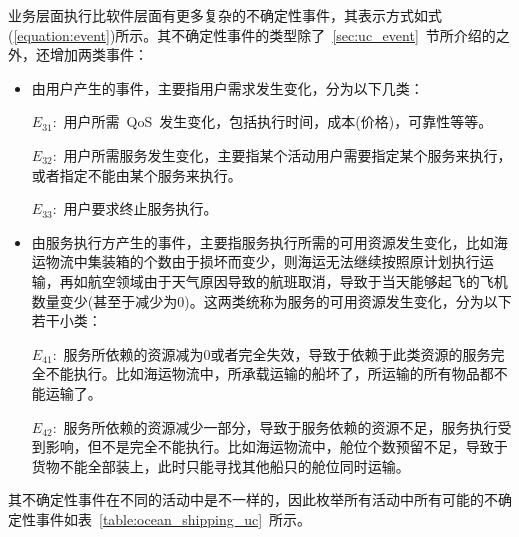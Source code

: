 业务层面执行比软件层面有更多复杂的不确定性事件，其表示方式如式(\ref{equation:event})所示。其不确定性事件的类型除了~\ref{sec:uc_event}~节所介绍的之外，还增加两类事件：

\begin{itemize}
    
    \item 由用户产生的事件，主要指用户需求发生变化，分为以下几类：
    
    $E_{31}$:~用户所需~QoS~发生变化，包括执行时间，成本(价格)，可靠性等等。
    
    $E_{32}$:~用户所需服务发生变化，主要指某个活动用户需要指定某个服务来执行，或者指定不能由某个服务来执行。

    $E_{33}$:~用户要求终止服务执行。

    \item 由服务执行方产生的事件，主要指服务执行所需的可用资源发生变化，比如海运物流中集装箱的个数由于损坏而变少，则海运无法继续按照原计划执行运输，再如航空领域由于天气原因导致的航班取消，导致于当天能够起飞的飞机数量变少(甚至于减少为0)。这两类统称为服务的可用资源发生变化，分为以下若干小类：
    
    $E_{41}$:~服务所依赖的资源减为0或者完全失效，导致于依赖于此类资源的服务完全不能执行。比如海运物流中，所承载运输的船坏了，所运输的所有物品都不能运输了。
    
    $E_{42}$:~服务所依赖的资源减少一部分，导致于服务依赖的资源不足，服务执行受到影响，但不是完全不能执行。比如海运物流中，舱位个数预留不足，导致于货物不能全部装上，此时只能寻找其他船只的舱位同时运输。
    
    
\end{itemize}

其不确定性事件在不同的活动中是不一样的，因此枚举所有活动中所有可能的不确定性事件如表~\ref{table:ocean_shipping_uc}~所示。

